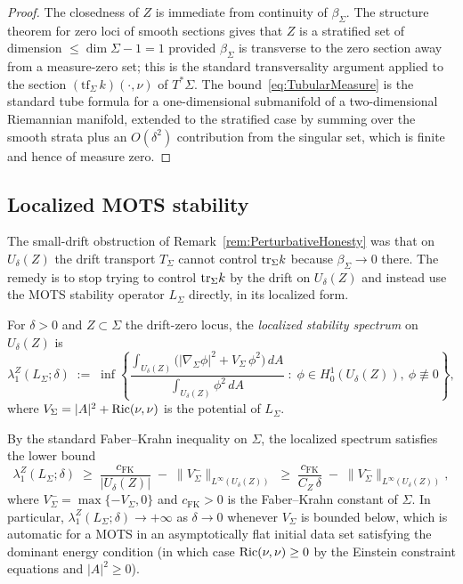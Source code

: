 \begin{proof}
The closedness of $Z$ is immediate from continuity of $\beta_\Sigma$. The structure theorem for zero loci of smooth sections gives that $Z$ is a stratified set of dimension $\le\dim\Sigma-1=1$ provided $\beta_\Sigma$ is transverse to the zero section away from a measure-zero set; this is the standard transversality argument applied to the section $(\mathrm{tf}_\Sigma\,k)(\cdot,\nu)$ of $T^*\Sigma$. The bound~\eqref{eq:TubularMeasure} is the standard tube formula for a one-dimensional submanifold of a two-dimensional Riemannian manifold, extended to the stratified case by summing over the smooth strata plus an $O(\delta^2)$ contribution from the singular set, which is finite and hence of measure zero.
\end{proof}

\subsection{Localized MOTS stability}

The small-drift obstruction of Remark~\ref{rem:PerturbativeHonesty} was that on $U_\delta(Z)$ the drift transport $T_\Sigma$ cannot control $\mathrm{tr}_\Sigma k$ because $\beta_\Sigma\to0$ there. The remedy is to stop trying to control $\mathrm{tr}_\Sigma k$ by the drift on $U_\delta(Z)$ and instead use the MOTS stability operator $L_\Sigma$ directly, in its localized form.

\begin{definition}\label{def:LocalizedSpectrum}
For $\delta>0$ and $Z\subset\Sigma$ the drift-zero locus, the \emph{localized stability spectrum} on $U_\delta(Z)$ is
\begin{equation}\label{eq:LocalizedSpectrum}
    \lambda_1^Z(L_\Sigma;\delta)
    \;:=\;
    \inf\left\{
    \frac{\int_{U_\delta(Z)}\bigl(|\nabla_\Sigma\phi|^2+V_\Sigma\,\phi^2\bigr)\,dA}
         {\int_{U_\delta(Z)}\phi^2\,dA}
    \;:\;
    \phi\in H_0^1(U_\delta(Z)),\ \phi\not\equiv0
    \right\},
\end{equation}
where $V_\Sigma=|A|^2+\mathrm{Ric}(\nu,\nu)$ is the potential of $L_\Sigma$.
\end{definition}

By the standard Faber--Krahn inequality on $\Sigma$, the localized spectrum satisfies the lower bound
\begin{equation}\label{eq:FaberKrahnLower}
    \lambda_1^Z(L_\Sigma;\delta)
    \;\ge\;
    \frac{c_{\mathrm{FK}}}{|U_\delta(Z)|}
    \;-\;\|V_\Sigma^-\|_{L^\infty(U_\delta(Z))}
    \;\ge\;
    \frac{c_{\mathrm{FK}}}{C_Z\,\delta}
    \;-\;\|V_\Sigma^-\|_{L^\infty(U_\delta(Z))},
\end{equation}
where $V_\Sigma^-=\max\{-V_\Sigma,0\}$ and $c_{\mathrm{FK}}>0$ is the Faber--Krahn constant of $\Sigma$. In particular, $\lambda_1^Z(L_\Sigma;\delta)\to+\infty$ as $\delta\to0$ whenever $V_\Sigma$ is bounded below, which is automatic for a MOTS in an asymptotically flat initial data set satisfying the dominant energy condition (in which case $\mathrm{Ric}(\nu,\nu)\ge0$ by the Einstein constraint equations and $|A|^2\ge0$).

